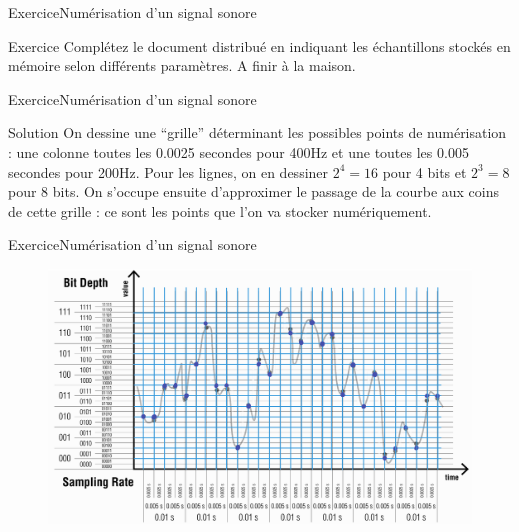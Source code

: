 \documentclass{beamer}
\begin{document}
\begin{frame}{Exercice}{Numérisation d'un signal sonore}
	\begin{alertblock}{Exercice}
		Complétez le document distribué en indiquant les échantillons stockés en mémoire selon différents paramètres. A finir à la maison.
	\end{alertblock}
\end{frame}

\begin{frame}{Exercice}{Numérisation d'un signal sonore}
	\begin{exampleblock}{Solution}
		On dessine une ``grille'' déterminant les possibles points de numérisation : une colonne toutes les 0.0025 secondes pour 400Hz et une toutes les 0.005 secondes pour 200Hz. Pour les lignes, on en dessiner $2^{4}=16$ pour 4 bits et $2^{3}=8$ pour 8 bits. On s'occupe ensuite d'approximer le passage de la courbe aux coins de cette grille : ce sont les points que l'on va stocker numériquement.
	\end{exampleblock}

\end{frame}
\begin{frame}{Exercice}{Numérisation d'un signal sonore}
	\begin{figure}
		\includegraphics[width=1\linewidth]{solution-sampling-1.png}
	\end{figure}
\end{frame}
\end{document}
